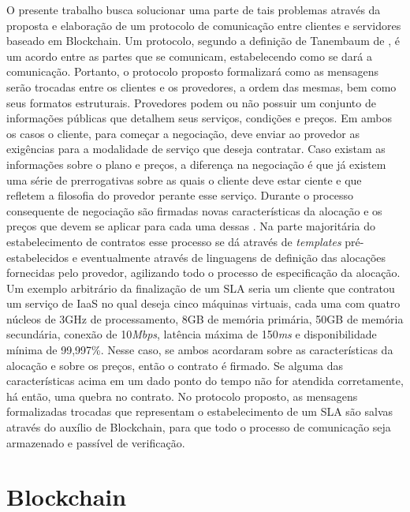 %
O presente trabalho busca solucionar uma parte de tais problemas através da proposta e elaboração de um protocolo de comunicação entre clientes e servidores baseado em Blockchain. 
%
Um protocolo, segundo a definição de Tanembaum de \citeyear{nuvem_sla:tanenbaum}, é um acordo entre as partes que se comunicam, estabelecendo como se dará a comunicação. Portanto, o protocolo proposto formalizará como as mensagens serão trocadas entre os clientes e os provedores, a ordem das mesmas, bem como seus formatos estruturais.
%
Provedores podem ou não possuir um conjunto de informações públicas que detalhem seus serviços, condições e preços. 
Em ambos os casos o cliente, para começar a negociação, deve enviar ao provedor as exigências para a modalidade de serviço que deseja contratar. Caso existam as informações sobre o plano e preços, a diferença na negociação é que já existem uma série de prerrogativas sobre as quais o cliente deve estar ciente e que refletem a filosofia do provedor perante esse serviço. Durante o processo consequente de negociação são firmadas novas características da alocação e os preços que devem se aplicar para cada uma dessas \cite{nuvem_sla:estabelecimento_contratos}. Na parte majoritária do estabelecimento de contratos esse processo se dá através de \textit{templates} pré-estabelecidos e eventualmente através de linguagens de definição das alocações fornecidas pelo provedor, agilizando todo o processo de especificação da alocação. Um exemplo arbitrário da finalização de um \ac{SLA} seria um cliente que contratou um serviço de \ac{IaaS} no qual deseja cinco máquinas virtuais, cada uma com quatro núcleos de 3GHz de processamento, 8GB de memória primária, 50GB de memória secundária, conexão de 10\textit{Mbps}, latência máxima de 150\textit{ms} e disponibilidade mínima de 99,997\%. Nesse caso, se ambos acordaram sobre as características da alocação e sobre os preços, então o contrato é firmado. Se alguma das características acima em um dado ponto do tempo não for atendida corretamente, há então, uma quebra no contrato.
%
No protocolo proposto, as mensagens formalizadas trocadas que representam o estabelecimento de um \ac{SLA} são salvas através do auxílio de Blockchain, para que todo o processo de comunicação seja armazenado e passível de verificação.
%


\section{Blockchain}
\label{sec:blockchain}

